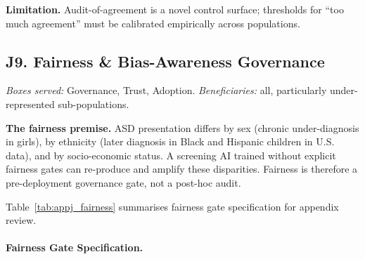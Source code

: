 \noindent\textbf{Limitation.} Audit-of-agreement is a novel control surface; thresholds for ``too much agreement'' must be calibrated empirically across populations.

\subsection*{J9. Fairness \& Bias-Awareness Governance}
\label{sec:appj_fairness}

\noindent\emph{Boxes served:} Governance, Trust, Adoption. \emph{Beneficiaries:} all, particularly under-represented sub-populations.

\noindent\textbf{The fairness premise.} ASD presentation differs by sex (chronic under-diagnosis in girls), by ethnicity (later diagnosis in Black and Hispanic children in U.S. data), and by socio-economic status. A screening AI trained without explicit fairness gates can re-produce and amplify these disparities. Fairness is therefore a pre-deployment governance gate, not a post-hoc audit.

\noindent Table~\ref{tab:appj_fairness} summarises fairness gate specification for appendix review.

\paragraph{Fairness Gate Specification.}




